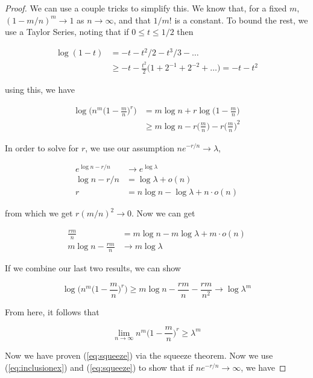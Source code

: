 \documentclass[11pt]{article}
\begin{document}
\begin{proof}
We can use a couple tricks to simplify this. We know that, for a fixed $m$, $(1 - m/n)^{m} \to 1$ as $n \to \infty$, and that $1/m!$ is a constant. To bound the rest, we use a Taylor Series, noting that if $0 \le t \le 1/2$ then

 \begin{align*}
\log(1 - t) &= -t - t^{2}/2 - t^{3}/3 - \ldots \\
&\ge -t - \frac{t^{2}}{2}\bigg(1 + 2^{-1} + 2^{-2} + \ldots\bigg) = -t - t^{2}
\end{align*}

\noindent using this, we have

\begin{align*}
\log{\bigg(n^{m}\bigg(1 - \frac{m}{n}\bigg)^{r}\bigg)} &= m\log{n} + r\log{\bigg(1 - \frac{m}{n}\bigg)} \\
&\ge m\log{n} - r\bigg(\frac{m}{n}\bigg) - r\bigg(\frac{m}{n}\bigg)^{2}
\end{align*}

\noindent In order to solve for $r$, we use our assumption $ne^{-r/n} \to \lambda$,

\begin{align*}
e^{\log{n} - r/n} &\to e^{\log{\lambda}} \\
\log{n} - r/n &= \log{\lambda} + o(n) \\
r &= n\log{n} - \log{\lambda} + n\cdot o(n)
\end{align*}

\noindent from which we get $r(m/n)^{2} \to 0$. Now we can get

 \begin{align*}
\frac{rm}{n} &= m\log{n} - m\log{\lambda} + m \cdot o(n) \\
m\log{n} - \frac{rm}{n} &\to m\log{\lambda} 
\end{align*}

\noindent If we combine our last two results, we can show

\begin{equation}
\log{\bigg(n^{m}\bigg(1 - \frac{m}{n}\bigg)^{r}\bigg)} \ge m\log{n} - \frac{rm}{n} - \frac{rm}{n^{2}} \to \log{\lambda^{m}}
\end{equation}

\noindent From here, it follows that

\begin{equation}
\lim_{n \to \infty}n^{m}\bigg(1 - \frac{m}{n}\bigg)^{r} \ge \lambda^{m}
\end{equation}

Now we have proven (\ref{eq:squeeze}) via the squeeze theorem. Now we use (\ref{eq:inclusionex}) and (\ref{eq:squeeze}) to show that if $ne^{-r/n} \to \infty$, we have 


\end{proof}
\end{document}

